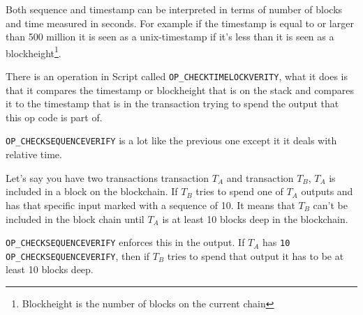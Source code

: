 Both sequence and timestamp can be interpreted in terms of number of blocks and time measured in seconds. For example if the timestamp is equal to or larger than 500 million it is seen as a unix-timestamp if it's less than it is seen as a blockheight\footnote{Blockheight is the number of blocks on the current chain}.

There is an operation in Script called \texttt{OP\_CHECKTIMELOCKVERITY}, what it does is that it compares the timestamp or blockheight that is on the stack and compares it to the timestamp that is in the transaction trying to spend the output that this op code is part of. 

\texttt{OP\_CHECKSEQUENCEVERIFY} is a lot like the previous one except it it deals with relative time. 

Let's say you have two transactions transaction $T_A$ and transaction $T_B$, $T_A$ is included in a block on the blockchain. If $T_B$ tries to spend one of $T_A$ outputs and has that specific input marked with a  sequence of 10. It means that $T_B$ can't be included in the block chain until $T_A$ is at least 10 blocks deep in the blockchain.

\texttt{OP\_CHECKSEQUENCEVERIFY} enforces this in the output. If $T_A$ has \texttt{10 OP\_CHECKSEQUENCEVERIFY}, then if $T_B$ tries to spend that output it has to be at least 10 blocks deep.
